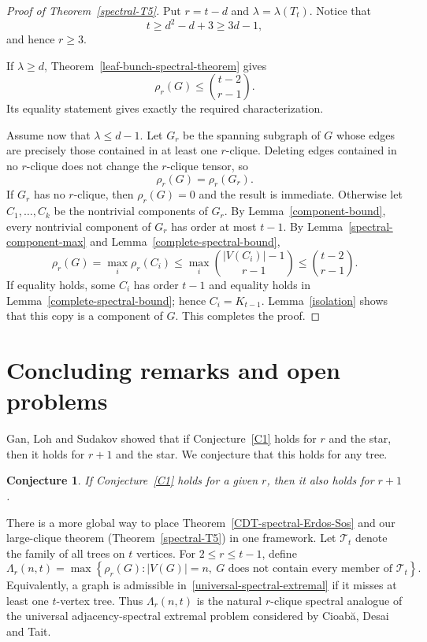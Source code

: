 \documentclass[11pt,a4paper]{article}
\newtheorem{conjecture}[theorem]{Conjecture}
\begin{document}
\begin{proof}[Proof of Theorem~\ref{spectral-T5}]
Put $r=t-d$ and $\lambda=\lambda(T_t)$. Notice that
\[
t\ge d^2-d+3\ge3d-1,
\]
and hence $r\ge3$.

If $\lambda\ge d$, Theorem~\ref{leaf-bunch-spectral-theorem} gives
\[
\rho_r(G)\le\binom{t-2}{r-1}.
\]
Its equality statement gives exactly the required characterization.

Assume now that $\lambda\le d-1$. Let $G_r$ be the spanning subgraph of $G$ whose edges are precisely those contained in at least one $r$-clique. Deleting edges contained in no $r$-clique does not change the $r$-clique tensor, so
\[
\rho_r(G)=\rho_r(G_r).
\]
If $G_r$ has no $r$-clique, then $\rho_r(G)=0$ and the result is immediate. Otherwise let $C_1,\ldots,C_k$ be the nontrivial components of $G_r$.  By Lemma~\ref{component-bound}, every nontrivial component of $G_r$ has order at most $t-1$. By Lemma~\ref{spectral-component-max} and Lemma~\ref{complete-spectral-bound},
\[
\rho_r(G)
=\max_i\rho_r(C_i)
\le\max_i\binom{|V(C_i)|-1}{r-1}
\le\binom{t-2}{r-1}.
\]
If equality holds, some $C_i$ has order $t-1$ and equality holds in Lemma~\ref{complete-spectral-bound}; hence $C_i=K_{t-1}$. Lemma~\ref{isolation} shows that this copy is a component of $G$.
 This completes the proof.
\end{proof}


\section{Concluding remarks and open problems}\label{concluding-remarks}

 Gan, Loh and Sudakov\cite{gan2015maximizing} showed that if Conjecture~\ref{C1} holds for  \(r\) and the star, then it holds for $r+1$ and the star. We conjecture that this holds for any tree.




\begin{conjecture}\label{C2}
If Conjecture~\ref{C1} holds for a given \(r\), then it also holds for \(r+1\).
\end{conjecture}




There is a more global way to place Theorem~\ref{CDT-spectral-Erdos-Sos} and our large-clique theorem (Theorem~\ref{spectral-T5}) in one framework. Let $\mathcal T_t$ denote the family of all trees on $t$ vertices.  For $2\le r\le t-1$, define
\begin{equation}\label{universal-spectral-extremal}
\Lambda_r(n,t)
=
\max\left\{
\rho_r(G): |V(G)|=n,\ \text{$G$ does not contain every member of $\mathcal T_t$}
\right\}.
\end{equation}
Equivalently, a graph is admissible in~\eqref{universal-spectral-extremal} if it misses at least one $t$-vertex tree. Thus $\Lambda_r(n,t)$ is the natural $r$-clique spectral analogue of the universal adjacency-spectral extremal problem considered by Cioab\u{a}, Desai and Tait.
\end{document}
